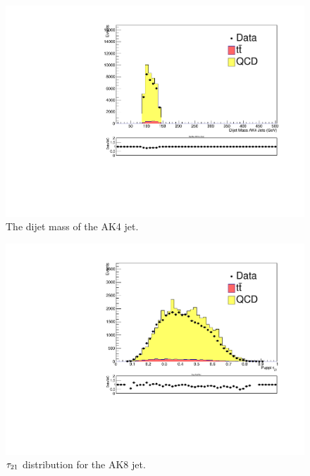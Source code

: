 \begin{figure}[thb!]
\begin{center}
\includegraphics[scale=0.5]{Figures/ratMCdijetmass.pdf}
\end{center}
\caption{The dijet mass of the AK4 jet.}
\label{fig:dMCAK4dijetmass}
\end{figure}

\begin{figure}[th!b]
\begin{center}
\includegraphics[scale=0.5]{Figures/ratMCptau21.pdf}
\end{center}
\caption{$\tau_{21}$ distribution for the AK8 jet.\label{fig:dMCtau21}}
\end{figure}

